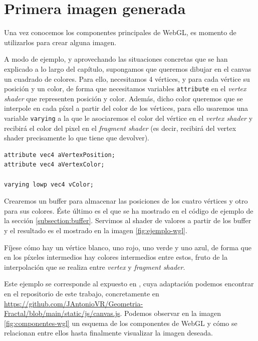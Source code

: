 \section{Primera imagen generada}

Una vez conocemos los componentes principales de WebGL, es momento de utilizarlos para crear alguna imagen.

A modo de ejemplo, y aprovechando las situaciones concretas que se han explicado a lo largo del capítulo, supongamos que queremos dibujar en el canvas un cuadrado de colores. Para ello, necesitamos 4 vértices, y para cada vértice su posición y un color, de forma que necesitamos variables \verb|attribute| en el \textit{vertex shader} que representen posición y color. Además, dicho color queremos que se interpole en cada píxel a partir del color de los vértices, para ello usaremos una variable \verb|varying| a la que le asociaremos el color del vértice en el \textit{vertex shader} y recibirá el color del pixel en el \textit{fragment shader} (es decir, recibirá del vertex shader precisamente lo que tiene que devolver).
\begin{lstlisting}
attribute vec4 aVertexPosition;
attribute vec4 aVertexColor;

varying lowp vec4 vColor;
\end{lstlisting}

Crearemos un buffer para almacenar las posiciones de los cuatro vértices y otro para sus colores. Éste último es el que se ha mostrado en el código de ejemplo de la sección \ref{subsection:buffer}. Servimos al shader de valores a partir de los buffer y el resultado es el mostrado en la imagen \ref{fig:ejemplo-wgl}.

Fíjese cómo hay un vértice blanco, uno rojo, uno verde y uno azul, de forma que en los píxeles intermedios hay colores intermedios entre estos, fruto de la interpolación que se realiza entre \textit{vertex} y \textit{fragment shader}.

Este ejemplo se corresponde al expuesto en \cite{MDN-1}, cuya adaptación podemos encontrar en el repositorio de este trabajo, concretamente en \url{https://github.com/JAntonioVR/Geometria-Fractal/blob/main/static/js/canvas.js}. Podemos observar en la imagen \ref{fig:componentes-wgl} un esquema de los componentes de WebGL y cómo se relacionan entre ellos hasta finalmente visualizar la imagen deseada.  %

\newpage

